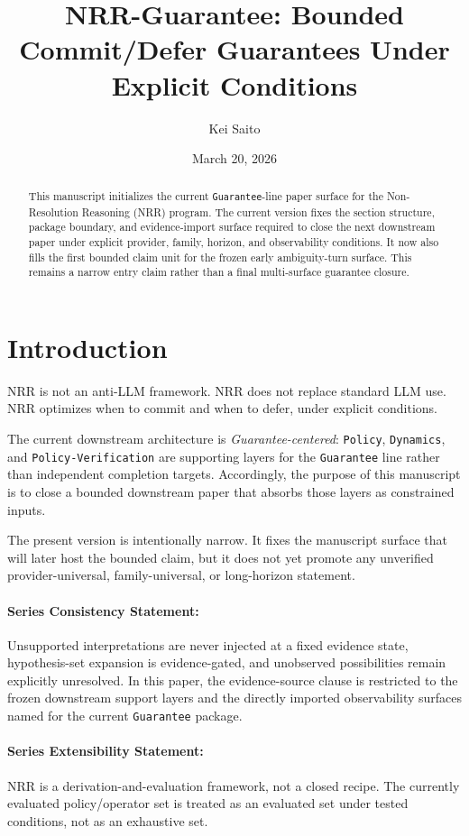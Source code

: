\documentclass[11pt]{article}
\title{NRR-Guarantee: Bounded Commit/Defer Guarantees Under Explicit Conditions}
\author{Kei Saito}
\date{March 20, 2026}
\begin{document}
\maketitle

\begin{abstract}
This manuscript initializes the current \texttt{Guarantee}-line paper surface for
the Non-Resolution Reasoning (NRR) program. The current version fixes the section
structure, package boundary, and evidence-import surface required to close the next
downstream paper under explicit provider, family, horizon, and observability
conditions. It now also fills the first bounded claim unit for the frozen early
ambiguity-turn surface. This remains a narrow entry claim rather than a final
multi-surface guarantee closure.
\end{abstract}

\section{Introduction}

NRR is not an anti-LLM framework. NRR does not replace standard LLM use. NRR
optimizes when to commit and when to defer, under explicit conditions.

The current downstream architecture is \textit{Guarantee-centered}: \texttt{Policy},
\texttt{Dynamics}, and \texttt{Policy-Verification} are supporting layers for the
\texttt{Guarantee} line rather than independent completion targets. Accordingly, the
purpose of this manuscript is to close a bounded downstream paper that absorbs those
layers as constrained inputs.

The present version is intentionally narrow. It fixes the manuscript surface that
will later host the bounded claim, but it does not yet promote any unverified
provider-universal, family-universal, or long-horizon statement.

\paragraph{Series Consistency Statement:}
Unsupported interpretations are never injected at a fixed evidence state,
hypothesis-set expansion is evidence-gated, and unobserved possibilities remain
explicitly unresolved. In this paper, the evidence-source clause is restricted to
the frozen downstream support layers and the directly imported observability
surfaces named for the current \texttt{Guarantee} package.

\paragraph{Series Extensibility Statement:}
NRR is a derivation-and-evaluation framework, not a closed recipe. The currently
evaluated policy/operator set is treated as an evaluated set under tested
conditions, not as an exhaustive set.
\end{document}
